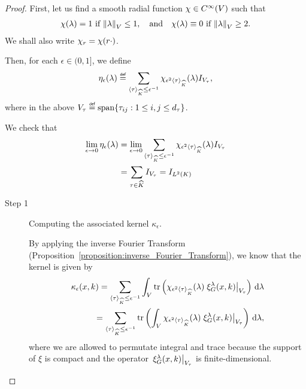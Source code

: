 \begin{proof}
    First, let us find a smooth radial function $\chi \in {C^\infty(V)}$ such that
    \begin{align*}
        \chi(\lambda) = 1 \  \text{if}\  \norm[\VectorSpace]{\lambda} \leq 1, \quad \text{and} \quad
        \chi(\lambda) \equiv 0 \ \text{if}\  \norm[\VectorSpace]{\lambda} \geq 2.
    \end{align*}
    We shall also write $\chi_r = \chi(r \cdot)$.

    Then, for each $\epsilon \in (0, 1]$,
    we define
    \begin{align*}
        \eta_\epsilon(\lambda)
        \defeq \sum_{\JapaneseBracket \CompactGroup \tau \leq \epsilon^{-1}} \chi_{\epsilon^2 \JapaneseBracket \CompactGroup \tau}(\lambda) \Id {V_\tau},
    \end{align*}
    where in the above $V_\tau \defeq \Span \{\tau_{ij} : 1 \leq i, j \leq \dimRep \tau\}$.

    We check that
    \begin{align*}
        \lim_{\epsilon \to 0} \eta_\epsilon(\lambda)
        &= \lim_{\epsilon \to 0} \sum_{{\langle \tau \rangle}_{{\widehat{K}}} \leq \epsilon^{-1}} \chi_{\epsilon^2 {\langle \tau \rangle}_{{\widehat{K}}}} (\lambda) {I_{V_\tau}}\\
        &= \sum_{\tau \in {\widehat{K}}} {I_{V_\tau}}
        = {I_{{L^{2} (K)}}}
    \end{align*}

    \begin{description}
        \item [Step 1] Computing the associated kernel $\kappa_\epsilon$.

            By applying the inverse Fourier Transform (Proposition~\ref{proposition:inverse_Fourier_Transform}),
            we know that the kernel is given by
            \begin{align}
                \kappa_\epsilon(x, k)
                = \sum_{{\langle \tau \rangle}_{{\widehat{K}}} \leq \epsilon^{-1}}
                \int_V
                \operatorname{tr} \left(\chi_{\epsilon^2 {\langle \tau \rangle}_{{\widehat{K}}}} (\lambda) \left. \xi^{\lambda}_{G}(x, k) \right|_{V_\tau}\right) \,\mathrm{d} \lambda \notag\\
                = \sum_{{\langle \tau \rangle}_{{\widehat{K}}} \leq \epsilon^{-1}}
                \operatorname{tr} \left(\int_V
                \chi_{\epsilon^2 {\langle \tau \rangle}_{{\widehat{K}}}} (\lambda) \left. \xi^{\lambda}_{G}(x, k) \right|_{V_\tau}\right) \,\mathrm{d} \lambda,
                \label{eq:Littlewood-Paley:computing_kernel}
            \end{align}
            where we are allowed to permutate integral and trace because the support of $\xi$ is compact
            and the operator $\left. \xi^{\lambda}_{G}(x, k) \right|_{V_\tau}$ is finite-dimensional.


\end{description}
\end{proof}

